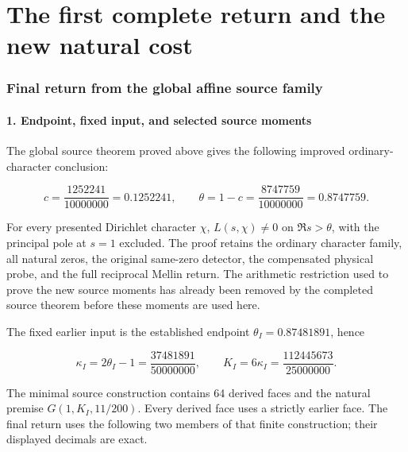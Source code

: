 \hypertarget{first-return:the-first-complete-return-and-the-new-natural-cost}{%
\section{The first complete return and the new natural cost}\label{first-return:the-first-complete-return-and-the-new-natural-cost}}

\hypertarget{first-return:final-return-from-the-global-affine-source-family}{%
\subsubsection{Final return from the global affine source family}\label{first-return:final-return-from-the-global-affine-source-family}}

\hypertarget{first-return:endpoint-fixed-input-and-selected-source-moments}{%
\paragraph{1. Endpoint, fixed input, and selected source moments}\label{first-return:endpoint-fixed-input-and-selected-source-moments}}

The global source theorem proved above gives the following improved ordinary-character conclusion:

\[
\boxed{\quad c=\frac{1252241}{10000000}=0.1252241,\qquad
\theta=1-c=\frac{8747759}{10000000}=0.8747759.\quad}
\tag{FR1}
\]

For every presented Dirichlet character \(\chi\), \(L(s,\chi)\ne0\) on \(\Re s>\theta\), with the principal pole at \(s=1\) excluded. The proof retains the ordinary character family, all natural zeros, the original same-zero detector, the compensated physical probe, and the full reciprocal Mellin return. The arithmetic restriction used to prove the new source moments has already been removed by the completed source theorem before these moments are used here.

The fixed earlier input is the established endpoint \(\theta_I=0.87481891\), hence

\[
\kappa_I=2\theta_I-1=\frac{37481891}{50000000},\qquad
K_I=6\kappa_I=\frac{112445673}{25000000}.
\tag{FR2}
\]

The minimal source construction contains 64 derived faces and the natural premise \(G(1,K_I,11/200)\). Every derived face uses a strictly earlier face. The final return uses the following two members of that finite construction; their displayed decimals are exact.

